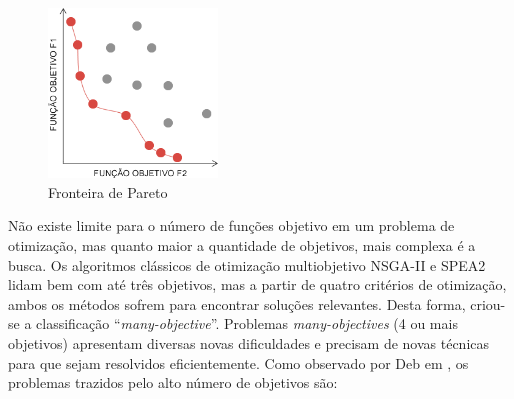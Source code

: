 \begin{figure}
	\label{fig_pareto}
	\caption{Fronteira de Pareto}
	\centering
	\includegraphics[width=0.4\textwidth]{cap_otimizacao-multi/figs/pareto}
\end{figure}

Não existe limite para o número de funções objetivo em um problema de otimização, mas quanto maior a quantidade de objetivos, mais complexa é a busca. Os algoritmos clássicos de otimização multiobjetivo \ac{NSGA-II} e \ac{SPEA2} lidam bem com até três objetivos, mas a partir de quatro critérios de otimização, ambos os métodos sofrem para encontrar soluções relevantes. Desta forma, criou-se a classificação ``\textit{many-objective}''. Problemas \textit{many-objectives} (4 ou mais objetivos) apresentam diversas novas dificuldades e precisam de novas técnicas para que sejam resolvidos eficientemente. Como observado por Deb em \cite{Deb2014}, os problemas trazidos pelo alto número de objetivos são:

